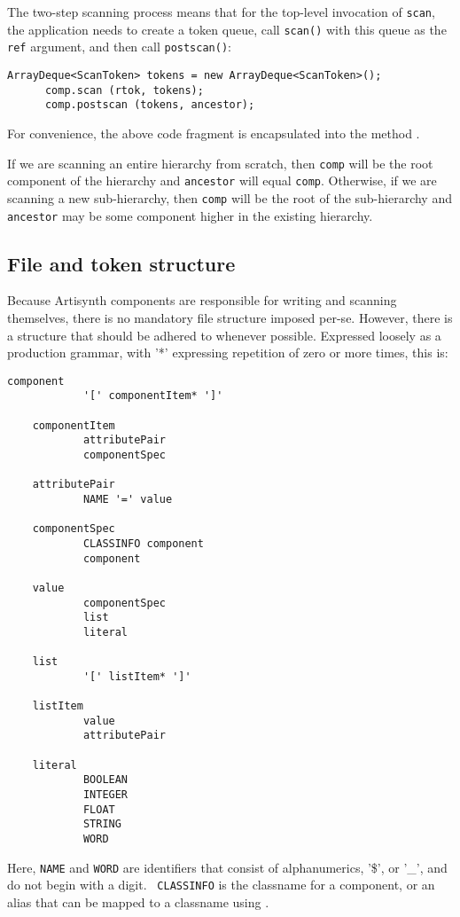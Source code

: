 \documentclass{article}
\begin{document}
The two-step scanning process means that for the top-level
invocation of {\tt scan}, the application 
needs to create a token queue, call {\tt scan()} with this
queue as the {\tt ref} argument, and then call {\tt postscan()}:
\begin{lstlisting}[]
      ArrayDeque<ScanToken> tokens = new ArrayDeque<ScanToken>();
      comp.scan (rtok, tokens);
      comp.postscan (tokens, ancestor);
\end{lstlisting}
For convenience, the above code fragment is encapsulated into the
method .

If we are scanning an entire hierarchy from scratch, then {\tt comp}
will be the root component of the hierarchy and {\tt ancestor} will
equal {\tt comp}. Otherwise, if we are scanning a new sub-hierarchy,
then {\tt comp} will be the root of the sub-hierarchy and {\tt
ancestor} may be some component higher in the existing hierarchy.

\subsection{File and token structure}
\label{fileStructureSec}

Because Artisynth components are responsible for writing and scanning
themselves, there is no mandatory file structure imposed per-se.
However, there is a structure that should be adhered to whenever
possible. Expressed loosely as a production grammar, with '*'
expressing repetition of zero or more times, this is:
\begin{lstlisting}[]
    component
            '[' componentItem* ']'
    
    componentItem
            attributePair
            componentSpec
    
    attributePair
            NAME '=' value
    
    componentSpec
            CLASSINFO component
            component
    
    value
            componentSpec
            list
            literal
    
    list
            '[' listItem* ']'
    
    listItem
            value
            attributePair
    
    literal
            BOOLEAN
            INTEGER
            FLOAT
            STRING
            WORD
\end{lstlisting}
Here, {\tt NAME} and {\tt WORD} are identifiers that consist of
alphanumerics, '\$', or '\_', and do not begin with a digit. {\tt
CLASSINFO} is the classname for a component, or an alias that can be
mapped to a classname using
.
\end{document}
